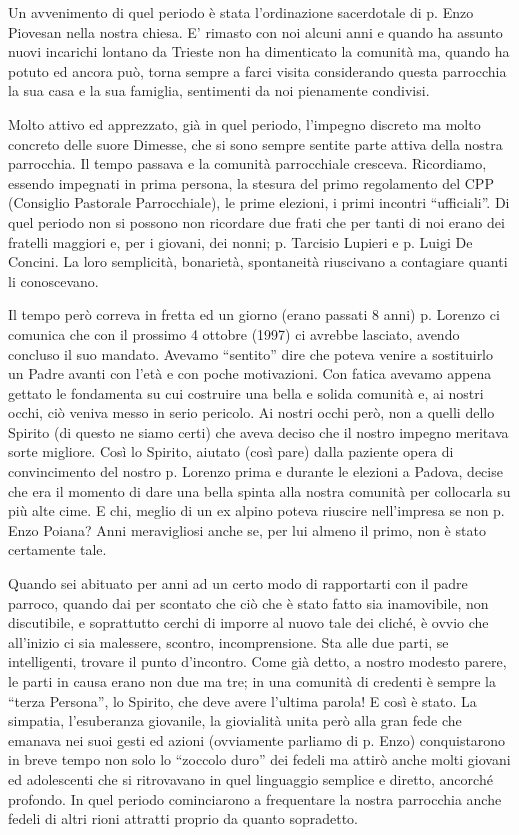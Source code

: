 Un avvenimento di quel periodo è stata l’ordinazione 
sacerdotale di p. Enzo Piovesan nella nostra chiesa. E’ rimasto con noi alcuni anni e quando ha 
assunto nuovi incarichi lontano da Trieste non ha dimenticato la comunità ma, quando ha potuto ed 
ancora può, torna sempre a farci visita considerando questa parrocchia la sua casa e la sua famiglia, 
sentimenti da noi pienamente condivisi.

Molto attivo ed apprezzato, già in quel periodo, l’impegno discreto ma molto concreto delle 
suore Dimesse, che si sono sempre sentite parte attiva della nostra parrocchia.
Il tempo passava e la comunità parrocchiale cresceva. Ricordiamo, essendo impegnati in prima 
persona, la stesura del primo regolamento del CPP (Consiglio Pastorale Parrocchiale), le prime 
elezioni, i primi incontri “ufficiali”. 
Di quel periodo non si possono non ricordare due frati che per tanti di noi erano dei fratelli maggiori 
e, per i giovani, dei nonni; p. Tarcisio Lupieri e p. Luigi De Concini. La loro semplicità, bonarietà, 
spontaneità riuscivano a contagiare quanti li conoscevano.

Il tempo però correva in fretta ed un giorno (erano passati 8 anni) p. Lorenzo ci comunica 
che con il prossimo 4 ottobre (1997) ci avrebbe lasciato, avendo concluso il suo mandato.
Avevamo “sentito” dire che poteva venire a sostituirlo un Padre avanti con l’età e con poche 
motivazioni. Con fatica avevamo appena gettato le fondamenta su cui costruire una bella e solida 
comunità e, ai nostri occhi, ciò veniva messo in serio pericolo. Ai nostri occhi però, non a quelli 
dello Spirito (di questo ne siamo certi) che aveva deciso che il nostro impegno meritava sorte 
migliore. Così lo Spirito, aiutato (così pare) dalla paziente opera di convincimento del nostro p. 
Lorenzo prima e durante le elezioni a Padova, decise che era il momento di dare una bella spinta 
alla nostra comunità per collocarla su più alte cime. E chi, meglio di un ex alpino poteva riuscire 
nell’impresa se non p. Enzo Poiana? Anni meravigliosi anche se, per lui almeno il primo, non è 
stato certamente tale.

Quando sei abituato per anni ad un certo modo di rapportarti con il padre parroco, quando dai per 
scontato che ciò che è stato fatto sia inamovibile, non discutibile, e soprattutto cerchi di imporre al 
nuovo tale dei cliché, è ovvio che all’inizio ci sia malessere, scontro, incomprensione. Sta alle due 
parti, se intelligenti, trovare il punto d’incontro. Come già detto, a nostro modesto parere, le parti in 
causa erano non due ma tre; in una comunità di credenti è sempre la “terza Persona”, lo Spirito, che 
deve avere l’ultima parola! E così è stato.
La simpatia, l’esuberanza giovanile, la giovialità unita però alla gran fede che emanava nei suoi 
gesti ed azioni (ovviamente parliamo di p. Enzo) conquistarono in breve tempo non solo lo “zoccolo 
duro” dei fedeli ma attirò anche molti giovani ed adolescenti che si ritrovavano in quel linguaggio 
semplice e diretto, ancorché profondo. In quel periodo cominciarono a frequentare la nostra 
parrocchia anche fedeli di altri rioni attratti proprio da quanto sopradetto.

